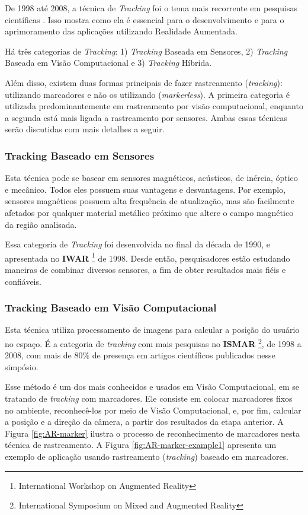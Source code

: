 De 1998 até 2008, a técnica de \textit{Tracking} foi o tema mais recorrente em pesquisas científicas
\cite{TrendsInAR}. Isso mostra como ela é essencial para o desenvolvimento e para o
aprimoramento das aplicações utilizando Realidade Aumentada.


Há três categorias de \textit{Tracking}: 1) \textit{Tracking} Baseada em Sensores,
2) \textit{Tracking} Baseada em Visão Computacional e 3) \textit{Tracking} Híbrida.

Além disso, existem duas formas principais de fazer rastreamento (\textit{tracking}): utilizando
marcadores e não os utilizando (\textit{markerless}). A primeira categoria é utilizada
predominantemente em rastreamento por visão computacional, enquanto a segunda está mais ligada
a rastreamento por sensores. Ambas essas técnicas serão discutidas com mais detalhes a seguir.




\subsubsection{Tracking Baseado em Sensores}

Esta técnica pode se basear em sensores magnéticos, acústicos, 
de inércia, óptico e mecânico. Todos eles possuem suas vantagens
e desvantagens. Por exemplo, sensores magnéticos possuem alta frequência de atualização,
mas são facilmente afetados por qualquer material metálico próximo que altere o campo 
magnético da região analisada. 

Essa categoria de \textit{Tracking} foi desenvolvida no final da década de 1990, e apresentada
no \textbf{IWAR}
\footnote{International Workshop on Augmented Reality} 
de 1998. Desde então, pesquisadores estão estudando maneiras de combinar diversos
sensores, a fim de obter resultados mais fiéis e confiáveis.


\subsubsection{Tracking Baseado em Visão Computacional}

Esta técnica utiliza processamento de imagens para calcular a posição do usuário no espaço. 
É a categoria de \textit{tracking} com mais pesquisas no \textbf{ISMAR}
\footnote{International Symposium on Mixed and Augmented Reality}, 
de 1998 a 2008, com mais
de 80\% de presença em artigos científicos publicados nesse simpósio.

Esse método é um dos mais conhecidos e usados em Visão Computacional, em se tratando de
\textit{tracking} com marcadores. Ele consiste em
colocar marcadores fixos no ambiente, reconhecê-los por meio de Visão Computacional, e,
por fim, calcular a posição e a direção da câmera, a partir dos resultados da etapa anterior.
A Figura \ref{fig:AR-marker} ilustra o processo de reconhecimento de marcadores nesta
técnica de rastreamento. A Figura \ref{fig:AR-marker-example1} apresenta um exemplo de aplicação
usando rastreamento (\textit{tracking}) baseado em marcadores.


